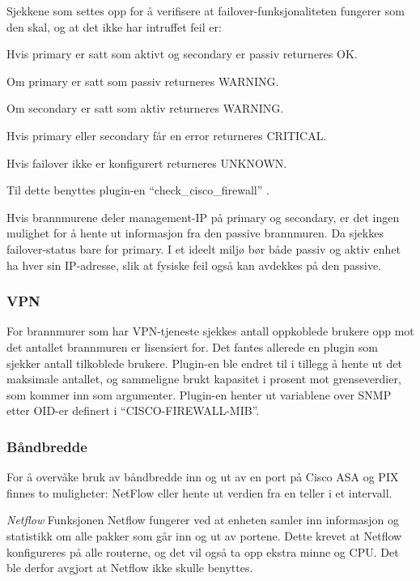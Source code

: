 Sjekkene som settes opp for å verifisere at failover-funksjonaliteten fungerer som den skal, og at det ikke har intruffet feil er:
\begin{itemize*}
\item Hvis primary er satt som aktivt og secondary er passiv returneres OK.
\item Om primary er satt som passiv returneres WARNING. 
\item Om secondary er satt som aktiv returneres WARNING.
\item Hvis primary eller secondary får en error returneres CRITICAL.
\item Hvis failover ikke er konfigurert returneres UNKNOWN. 
\end{itemize*}

Til dette benyttes plugin-en ``check\_cisco\_firewall'' \cite{checkciscofirewall}.

Hvis brannmurene deler management-IP på primary og secondary, er det ingen mulighet for å hente ut informasjon fra den passive brannmuren. Da sjekkes failover-status bare for primary. I et ideelt miljø bør både passiv og aktiv enhet ha hver sin IP-adresse, slik at fysiske feil også kan avdekkes på den passive.

\subsubsection{VPN}
For brannmurer som har VPN-tjeneste sjekkes antall oppkoblede brukere opp mot det antallet brannmuren er lisensiert for. Det fantes allerede en plugin som sjekker antall tilkoblede brukere\cite{checkciscovpn}. Plugin-en ble endret til i tillegg å hente ut det maksimale antallet, og sammeligne brukt kapasitet i prosent mot grenseverdier, som kommer inn som argumenter. Plugin-en henter ut variablene over SNMP etter OID-er definert i ``CISCO-FIREWALL-MIB''\cite{cisco_fw_mib}.

\subsubsection{Båndbredde}
For å overvåke bruk av båndbredde inn og ut av en port på Cisco ASA og PIX finnes to muligheter: NetFlow eller hente ut verdien fra en teller i et intervall.

\textit{Netflow}
Funksjonen Netflow\cite{ciscoiosnetflow} fungerer ved at enheten samler inn informasjon og statistikk om alle pakker som går inn og ut av portene. Dette krevet at Netflow konfigureres på alle routerne, og det vil også ta opp ekstra minne og CPU\cite{cisconetflowperf}. Det ble derfor avgjort at Netflow ikke skulle benyttes.

